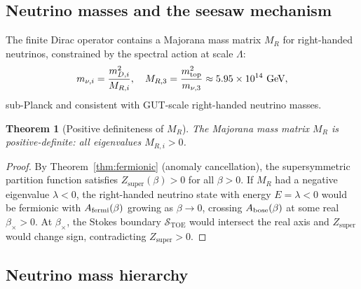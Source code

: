\documentclass[12pt]{article}
\newtheorem{theorem}{Theorem}[section]
\theoremstyle{definition}
\theoremstyle{remark}
\newcommand{\TOE}{\mathrm{TOE}}
\begin{document}
\subsection{Neutrino masses and the seesaw mechanism}

The finite Dirac operator contains a Majorana mass matrix $M_R$ for right-handed
neutrinos, constrained by the spectral action at scale $\Lambda$:
\begin{equation}
  m_{\nu,i} = \frac{m_{D,i}^2}{M_{R,i}}, \quad
  M_{R,3} = \frac{m_{\rm top}^2}{m_{\nu,3}} \approx 5.95 \times 10^{14}\ \text{GeV},
\end{equation}
sub-Planck and consistent with GUT-scale right-handed neutrino masses.

\begin{theorem}[Positive definiteness of $M_R$]
\label{thm:MR_positive}
The Majorana mass matrix $M_R$ is positive-definite: all eigenvalues $M_{R,i} > 0$.
\end{theorem}

\begin{proof}
By Theorem~\ref{thm:fermionic} (anomaly cancellation), the supersymmetric
partition function satisfies $Z_\mathrm{super}(\beta) > 0$ for all $\beta > 0$.
If $M_R$ had a negative eigenvalue $\lambda < 0$, the right-handed neutrino state
with energy $E = \lambda < 0$ would be fermionic with $A_{\rm fermi}(\beta)$
growing as $\beta \to 0$, crossing $A_{\rm bose}(\beta)$ at some real $\beta_\times > 0$.
At $\beta_\times$, the Stokes boundary $\mathcal{S}_\TOE$ would intersect the real axis
and $Z_\mathrm{super}$ would change sign, contradicting $Z_\mathrm{super} > 0$.
\end{proof}

\subsection{Neutrino mass hierarchy}
\end{document}

